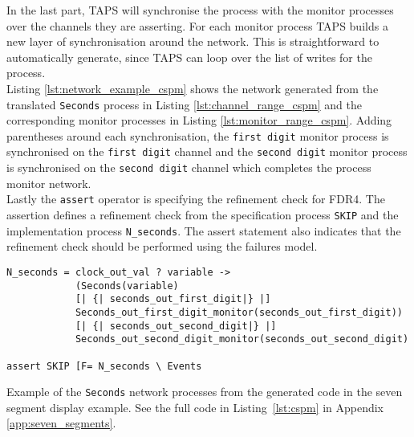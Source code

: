 In the last part, TAPS will synchronise the process with the monitor processes over the channels they are asserting.
For each monitor process TAPS builds a new layer of synchronisation around the network. This is straightforward to automatically generate, since TAPS can loop over the list of writes for the process. \\

Listing \ref{lst:network_example_cspm} shows the network generated from the translated \texttt{Seconds} process in Listing \ref{lst:channel_range_cspm} and the corresponding monitor processes in Listing \ref{lst:monitor_range_cspm}. Adding parentheses around each synchronisation, the \texttt{first digit} monitor process is synchronised on the \texttt{first digit} channel and the \texttt{second digit} monitor process is synchronised on the \texttt{second digit} channel which completes the process monitor network.\\

Lastly the \cspm{} \texttt{assert} operator is specifying the refinement check for FDR4. The assertion defines a refinement check from the specification process \texttt{SKIP} and the implementation process \texttt{N\_seconds}. The assert statement also indicates that the refinement check should be performed using the failures model.\\
\begin{listing}
\begin{verbatim}
N_seconds = clock_out_val ? variable ->
            (Seconds(variable)
            [| {| seconds_out_first_digit|} |]
            Seconds_out_first_digit_monitor(seconds_out_first_digit))
            [| {| seconds_out_second_digit|} |]
            Seconds_out_second_digit_monitor(seconds_out_second_digit)

assert SKIP [F= N_seconds \ Events
\end{verbatim}
\caption{Example of the \texttt{Seconds} network processes from the generated \cspm{} code in the seven segment display example. See the full code in Listing~\ref{lst:cspm} in Appendix \ref{app:seven_segments}.}
\label{lst:network_example_cspm}
\end{listing}

